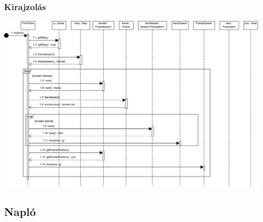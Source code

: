 		\subsubsection{Kirajzolás}
		    \begin{center}
			    \includegraphics[scale=0.70, angle=-90]{resources/drawing.png}
		    \end{center}
	
		\subsection{Napló}
	

